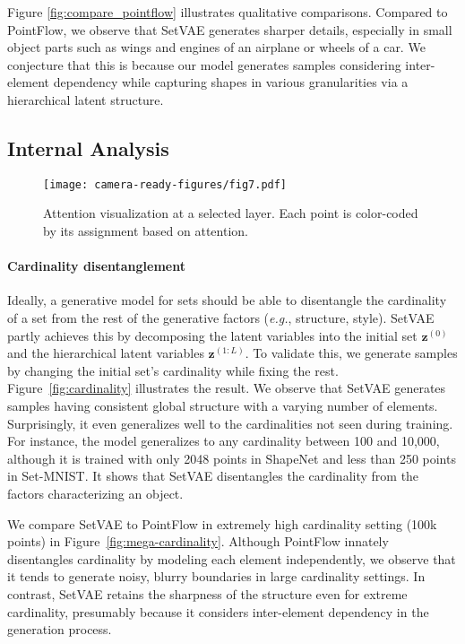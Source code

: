 \documentclass[final]{arxiv/cvpr}
\begin{document}
Figure \ref{fig:compare_pointflow} illustrates qualitative comparisons.
Compared to PointFlow, we observe that SetVAE generates sharper details, especially in small object parts such as wings and engines of an airplane or wheels of a car.
We conjecture that this is because our model generates samples considering inter-element dependency while capturing shapes in various granularities via a hierarchical latent structure.

\subsection{Internal Analysis}
\label{sec:qualitative}

\begin{figure}[!t]
    \centering
    \texttt{[image: camera-ready-figures/fig7.pdf]}
    \vspace{-0.7cm}
    \caption{
    Attention visualization at a selected layer.
    Each point is color-coded by its assignment based on attention.
    }
    \label{fig:subset}
    \vspace{-0.6cm}
\end{figure}

\paragraph{Cardinality disentanglement}
Ideally, a generative model for sets should be able to disentangle the cardinality of a set from the rest of the generative factors (\emph{e.g.}, structure, style). 
SetVAE partly achieves this by decomposing the latent variables into the initial set $\mathbf{z}^{(0)}$ and the hierarchical latent variables $\mathbf{z}^{(1:L)}$.
To validate this, we generate samples by changing the initial set's cardinality while fixing the rest.
Figure~\ref{fig:cardinality} illustrates the result.
We observe that SetVAE generates samples having consistent global structure with a varying number of elements.
Surprisingly, it even generalizes well to the cardinalities not seen during training.
For instance, the model generalizes to any cardinality between 100 and 10,000, although it is trained with only 2048 points in ShapeNet and less than 250 points in Set-MNIST.
It shows that SetVAE disentangles the cardinality from the factors characterizing an object.

We compare SetVAE to PointFlow in extremely high cardinality setting (100k points) in Figure~\ref{fig:mega-cardinality}.
Although PointFlow innately disentangles cardinality by modeling each element independently, we observe that it tends to generate noisy, blurry boundaries in large cardinality settings.
In contrast, SetVAE retains the sharpness of the structure even for extreme cardinality, presumably because it considers inter-element dependency in the generation process.
\end{document}
